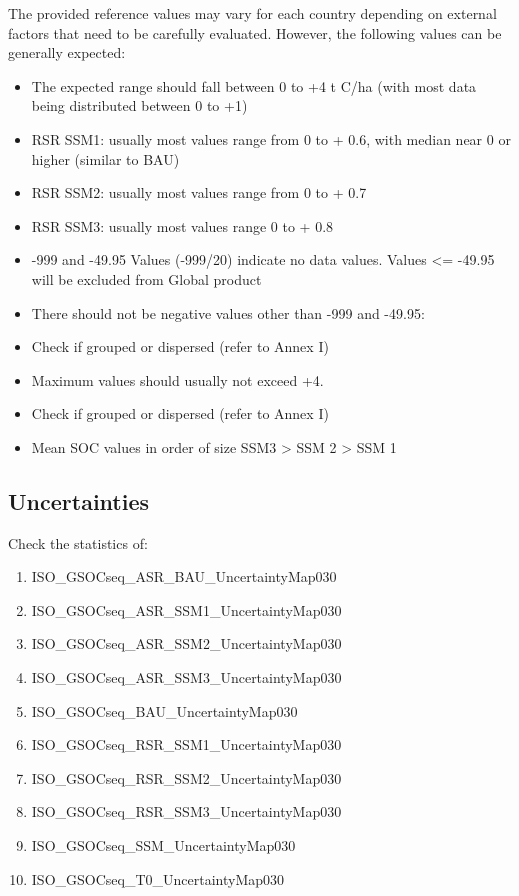 \documentclass[
  10pt,
  b5paper,
]{book}
\providecommand{\tightlist}{%
  \setlength{\itemsep}{0pt}\setlength{\parskip}{0pt}}
\begin{document}
The provided reference values may vary for each country depending on external factors that need to be carefully evaluated. However, the following values can be generally expected:

\begin{itemize}
\tightlist
\item
  The expected range should fall between 0 to +4 t C/ha (with most data being distributed between 0 to +1)
\item
  RSR SSM1: usually most values range from 0 to + 0.6, with median near 0 or higher (similar to BAU)
\item
  RSR SSM2: usually most values range from 0 to + 0.7
\item
  RSR SSM3: usually most values range 0 to + 0.8
\item
  -999 and -49.95 Values (-999/20) indicate no data values. Values \textless= -49.95 will be excluded from Global product
\item
  There should not be negative values other than -999 and -49.95:
\item
  Check if grouped or dispersed (refer to Annex I)
\item
  Maximum values should usually not exceed +4.
\item
  Check if grouped or dispersed (refer to Annex I)
\item
  Mean SOC values in order of size SSM3 \textgreater{} SSM 2 \textgreater{} SSM 1
\end{itemize}

\hypertarget{uncertainties}{%
\subsection*{Uncertainties}\label{uncertainties}}

Check the statistics of:

\begin{enumerate}
\def\labelenumi{\arabic{enumi}.}
\tightlist
\item
  ISO\_GSOCseq\_ASR\_BAU\_UncertaintyMap030
\item
  ISO\_GSOCseq\_ASR\_SSM1\_UncertaintyMap030
\item
  ISO\_GSOCseq\_ASR\_SSM2\_UncertaintyMap030
\item
  ISO\_GSOCseq\_ASR\_SSM3\_UncertaintyMap030
\item
  ISO\_GSOCseq\_BAU\_UncertaintyMap030
\item
  ISO\_GSOCseq\_RSR\_SSM1\_UncertaintyMap030
\item
  ISO\_GSOCseq\_RSR\_SSM2\_UncertaintyMap030
\item
  ISO\_GSOCseq\_RSR\_SSM3\_UncertaintyMap030
\item
  ISO\_GSOCseq\_SSM\_UncertaintyMap030
\item
  ISO\_GSOCseq\_T0\_UncertaintyMap030
\end{enumerate}
\end{document}
